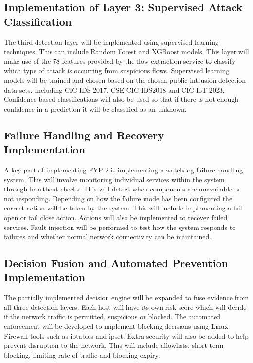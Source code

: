 \subsection{Implementation of Layer 3: Supervised Attack Classification}\label{sec:10.2.1}

\noindent The third detection layer will be implemented using supervised learning techniques. This can include Random Forest and XGBoost models. This layer will make use of the 78 features provided by the flow extraction service to classify which type of attack is occurring from suspicious flows. Supervised learning models will be trained and chosen based on the chosen public intrusion detection data sets. Including CIC-IDS-2017, CSE-CIC-IDS2018 and CIC-IoT-2023. Confidence based classifications will also be used so that if there is not enough confidence in a prediction it will be classified as an unknown.

\subsection{Failure Handling and Recovery Implementation}\label{sec:10.2.2}

\noindent A key part of implementing FYP-2 is implementing a watchdog failure handling system. This will involve monitoring individual services within the system through heartbeat checks. This will detect when components are unavailable or not responding. Depending on how the failure mode has been configured the correct action will be taken by the system. This will include implementing a fail open or fail close action. Actions will also be implemented to recover failed services. Fault injection will be performed to test how the system responds to failures and whether normal network connectivity can be maintained.

\subsection{Decision Fusion and Automated Prevention Implementation}\label{sec:10.2.3}

\noindent The partially implemented decision engine will be expanded to fuse evidence from all three detection layers. Each host will have its own risk score which will decide if the network traffic is permitted, suspicious or blocked. The automated enforcement will be developed to implement blocking decisions using Linux Firewall tools such as iptables and ipset. Extra security will also be added to help prevent disruption to the network. This will include allowlists, short term blocking, limiting rate of traffic and blocking expiry.

